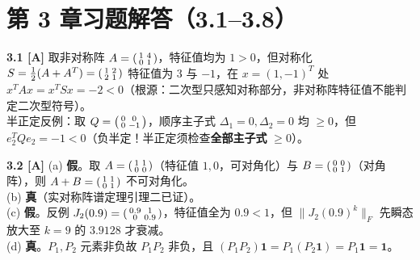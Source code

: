 \section{第 3 章习题解答（3.1--3.8）}

\textbf{3.1 [A]}
取非对称阵 $A = \begin{psmallmatrix}1&4\\0&1\end{psmallmatrix}$，特征值均为 $1 > 0$，但对称化 $S = \frac{1}{2}(A+A^T) = \begin{psmallmatrix}1&2\\2&1\end{psmallmatrix}$ 特征值为 $3$ 与 $-1$，在 $x=(1,-1)^T$ 处 $x^T A x = x^T S x = -2 < 0$（根源：二次型只感知对称部分，非对称阵特征值不能判定二次型符号）。\\
半正定反例：取 $Q = \begin{psmallmatrix}0&0\\0&-1\end{psmallmatrix}$，顺序主子式 $\Delta_1=0, \Delta_2=0$ 均 $\ge 0$，但 $e_2^T Q e_2 = -1 < 0$（负半定！半正定须检查\textbf{全部主子式} $\ge 0$）。

\textbf{3.2 [A]}
(a) \textbf{假}。取 $A = \begin{psmallmatrix}1&1\\0&0\end{psmallmatrix}$（特征值 $1,0$，可对角化）与 $B = \begin{psmallmatrix}0&0\\0&1\end{psmallmatrix}$（对角阵），则 $A+B = \begin{psmallmatrix}1&1\\0&1\end{psmallmatrix}$ 不可对角化。\\
(b) \textbf{真}（实对称阵谱定理引理二已证）。\\
(c) \textbf{假}。反例 $J_2(0.9)=\begin{psmallmatrix}0.9&1\\0&0.9\end{psmallmatrix}$，特征值全为 $0.9<1$，但 $\|J_2(0.9)^k\|_F$ 先瞬态放大至 $k=9$ 的 $3.9128$ 才衰减。\\
(d) \textbf{真}。$P_1, P_2$ 元素非负故 $P_1P_2$ 非负，且 $(P_1 P_2)\mathbf{1} = P_1(P_2\mathbf{1}) = P_1\mathbf{1} = \mathbf{1}$。


